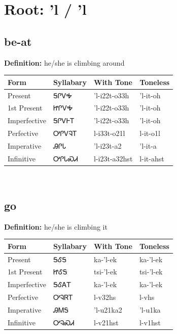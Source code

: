 \documentclass{article}%
\begin{document}
%
\normalsize%
\section*{Root: 'l / 'l}%
\subsection*{be-at}%
\textbf{Definition: }%
he/she is climbing around%
\\[0.5em]%
\begin{tabular}{|l|l|l|l|}%
\hline%
\textbf{Form}&\textbf{Syllabary}&\textbf{With Tone}&\textbf{Toneless}\\%
\hline%
Present&ᎦᎵᏙᎭ&'l{-}i22t{-}o33h&'l{-}it{-}oh\\%
1st Present&ᏥᎵᏙᎭ&'l{-}i22t{-}o33h&'l{-}it{-}oh\\%
Imperfective&ᎦᎵᏙᎰᎢ&'l{-}i22t{-}o33h&'l{-}it{-}oh\\%
Perfective&ᎤᎵᏙᎸᎢ&l{-}i33t{-}o21l&l{-}it{-}o1l\\%
Imperative&ᎯᎵᏓ&'l{-}i23t{-}a2&'l{-}it{-}a\\%
Infinitive&ᎤᎵᏓᏍᏗ&l{-}i23t{-}a32hst&l{-}it{-}ahst\\%
\hline%
\end{tabular}%
\\[1em]%
\subsection*{go}%
\textbf{Definition: }%
he/she is climbing it%
\\[0.5em]%
\begin{tabular}{|l|l|l|l|}%
\hline%
\textbf{Form}&\textbf{Syllabary}&\textbf{With Tone}&\textbf{Toneless}\\%
\hline%
Present&ᎦᎴᎦ&ka{-}'l{-}ek&ka{-}'l{-}ek\\%
1st Present&ᏥᎴᎦ&tsi{-}'l{-}ek&tsi{-}'l{-}ek\\%
Imperfective&ᎦᎴᎪᎢ&ka{-}'l{-}ek&ka{-}'l{-}ek\\%
Perfective&ᎤᎸᏒᎢ&l{-}v32hs&l{-}vhs\\%
Imperative&ᎯᎷᎦ&'l{-}u21ka2&'l{-}u1ka\\%
Infinitive&ᎤᎸᏍᏗ&l{-}v21hst&l{-}v1hst\\%
\hline%
\end{tabular}%
\\[1em]%
\end{document}
